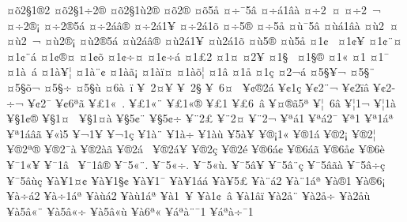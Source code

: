 {^^a4^^f52^^a71^^ae2
^^a4^^f52^^a71^^f72^^ae
^^a4^^f52^^a71^^f92^^ae
^^a4^^f52^^ae
^^a4^^f55^^e5
^^a4^^f7^^af5^^e2
^^a4^^f7^^e11^^e2^^e0
^^a4^^f72^^a0^^a4
^^a4^^f72^^a0^^ac
^^a4^^f72^^ae^^a1
^^a4^^f72^^ae5^^e1
^^a4^^f72^^e1^^e2^^ae
^^a4^^f72^^e11^^a5
^^a4^^f72^^e11^^f5
^^a4^^f75^^ae^^ad
^^a4^^f75^^e5
^^a4^^f9^^af5^^e2
^^a4^^f9^^e11^^e2^^e0
^^a4^^f92^^a0^^a4
^^a4^^f92^^a0^^ac
^^a4^^f92^^ae^^a1
^^a4^^f92^^ae5^^e1
^^a4^^f92^^e1^^e2^^ae
^^a4^^f92^^e11^^a5
^^a4^^f92^^e11^^f5
^^a4^^f95^^ae^^ad
^^a4^^f95^^e5
^^a41^^a2^^a0
^^a41^^a2^^a5
^^a41^^a2^^a8^^a4
^^a41^^a2^^a8^^e1
^^a41^^a2^^ae^^a4
^^a41^^a2^^f5
^^a41^^a2^^f7^^a4
^^a41^^a2^^f7^^e1
^^a41^^a32
^^a41^^a4
^^a42^^a5
^^a41^^a7^^a0
^^a41^^a7^^ae
^^a41^^ab
^^a41^^ad
^^a41^^af
^^a41^^e0^^a0^^e1
^^a41^^e0^^a5^^a6
^^a41^^e0^^a8^^a2
^^a41^^e0^^e3^^a1
^^a41^^e0^^ef^^a4
^^a41^^e0^^f5^^a6
^^a41^^e2
^^a41^^e5
^^a41^^e7
^^a42^^ac^^e1
^^a45^^a7^^a5^^ac
^^a45^^a7^^a8
^^a45^^a7^^f5^^ac
^^a45^^a7^^f7
^^a45^^a7^^f9
^^a46^^e0^^a0^^ef
^^a5^^a02^^a4^^a5
^^a5^^a02^^a7
^^a5^^a06^^a4^^a0
^^a5^^a2^^ae2^^e1
^^a5^^a21^^e7
^^a5^^a22^^ad^^a8^^ac
^^a5^^a22^^ad^^ef^^e2
^^a5^^a22^^ad^^f7^^ac
^^a5^^a22^^af
^^a5^^a26^^aa^^e3
^^a5^^a31^^ab^^a0.
^^a5^^a31^^ab^^a8
^^a5^^a31^^ab^^ae
^^a5^^a31^^ad
^^a5^^a36^^ad^^a0^^e2
^^a5^^a4^^ae^^e35^^aa
^^a5^^a6^^a06^^e2
^^a5^^a61^^ac
^^a5^^a61^^e0
^^a5^^a71^^a2^^ae
^^a5^^a71^^a4^^a0
^^a5^^a71^^a4^^e0
^^a5^^a75^^a2^^a8
^^a5^^a75^^a2^^f7
^^a5^^a82^^a3
^^a5^^a82^^a4
^^a5^^a82^^ac
^^a5^^aa^^e11
^^a5^^aa^^e12^^af
^^a5^^aa1^^ad
^^a5^^aa1^^e1^^aa
^^a5^^aa1^^e1^^e2^^e3
^^a5^^ab^^ec5
^^a5^^ac1^^ad^^a5
^^a5^^ac1^^e7
^^a5^^ad1^^e0^^a8
^^a5^^ad1^^e0^^f7
^^a5^^ad1^^e0^^f9
^^a5^^ad5^^e0^^a5
^^a5^^ae^^a11^^ab
^^a5^^ae1^^e1
^^a5^^ae2^^a1
^^a5^^ae2^^a6
^^a5^^ae2^^aa^^ae^^ad
^^a5^^ae2^^af^^e0
^^a5^^ae2^^e0^^e3
^^a5^^ae2^^e1^^a0
^^a5^^ae2^^e1^^a5
^^a5^^ae2^^e7
^^a5^^ae2^^e9
^^a5^^ae6^^e1^^a2
^^a5^^ae6^^e1^^e3
^^a5^^ae6^^e5^^a2
^^a5^^ae6^^e8
^^a5^^af1^^ab^^a5
^^a5^^af1^^e2^^a0
^^a5^^af1^^e2^^ae
^^a5^^af5^^ab^^a8.
^^a5^^af5^^ab^^f7.
^^a5^^af5^^ab^^f9.
^^a5^^af5^^e2^^a5
^^a5^^af5^^e2^^a8^^e7
^^a5^^af5^^e2^^e3^^e0
^^a5^^af5^^e2^^f7^^e7
^^a5^^af5^^e2^^f9^^e7
^^a5^^e0^^a51^^a4^^a2
^^a5^^e0^^a51^^a7^^a2
^^a5^^e0^^a51^^af
^^a5^^e0^^a51^^e1^^e1
^^a5^^e0^^a55^^a3^^ad
^^a5^^e0^^a8^^e12
^^a5^^e0^^a81^^e1^^aa
^^a5^^e0^^ae1
^^a5^^e0^^ae6^^a1
^^a5^^e0^^f7^^e12
^^a5^^e0^^f71^^e1^^aa
^^a5^^e0^^f9^^e12
^^a5^^e0^^f91^^e1^^aa
^^a5^^e01^^a0^^a5
^^a5^^e01^^a2^^a0^^e2
^^a5^^e01^^e2^^ef
^^a5^^e02^^e5^^a8
^^a5^^e02^^e5^^f7
^^a5^^e02^^e5^^f9
^^a5^^e05^^e2^^ab^^a8
^^a5^^e05^^e2^^ab^^f7
^^a5^^e05^^e2^^ab^^f9
^^a5^^e06^^aa^^ab
^^a5^^e1^^aa^^e0^^a8^^af1
^^a5^^e1^^aa^^e0^^f7^^af1
}
